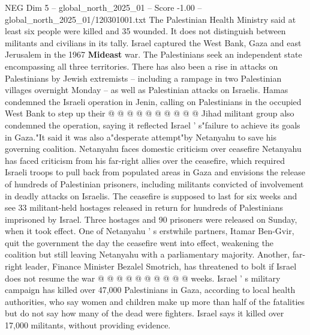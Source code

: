 \begin{textsample}{NEG Dim 5 – global\_north\_2025\_01 – Score -1.00 – global\_north\_2025\_01/120301001.txt}
The Palestinian Health Ministry said at least six people were killed and 35 wounded.
It does not distinguish between militants and civilians in its tally.
Israel captured the West Bank, Gaza and east Jerusalem in the 1967 \textbf{Mideast} war.
The Palestinians seek an independent state encompassing all three territories.
There has also been a rise in attacks on Palestinians by Jewish extremists -- including a rampage in two Palestinian villages overnight Monday -- as well as Palestinian attacks on Israelis.
Hamas condemned the Israeli operation in Jenin, calling on Palestinians in the occupied West Bank to step up their @ @ @ @ @ @ @ @ @ @ Jihad militant group also condemned the operation, saying it reflected Israel ' s"failure to achieve its goals in Gaza."It said it was also a"desperate attempt"by Netanyahu to save his governing coalition.
Netanyahu faces domestic criticism over ceasefire Netanyahu has faced criticism from his far-right allies over the ceasefire, which required Israeli troops to pull back from populated areas in Gaza and envisions the release of hundreds of Palestinian prisoners, including militants convicted of involvement in deadly attacks on Israelis.
The ceasefire is supposed to last for six weeks and see 33 militant-held hostages released in return for hundreds of Palestinians imprisoned by Israel.
Three hostages and 90 prisoners were released on Sunday, when it took effect.
One of Netanyahu ' s erstwhile partners, Itamar Ben-Gvir, quit the government the day the ceasefire went into effect, weakening the coalition but still leaving Netanyahu with a parliamentary majority.
Another, far-right leader, Finance Minister Bezalel Smotrich, has threatened to bolt if Israel does not resume the war @ @ @ @ @ @ @ @ @ @ weeks.
Israel ' s military campaign has killed over 47,000 Palestinians in Gaza, according to local health authorities, who say women and children make up more than half of the fatalities but do not say how many of the dead were fighters.
Israel says it killed over 17,000 militants, without providing evidence.

\end{textsample}
